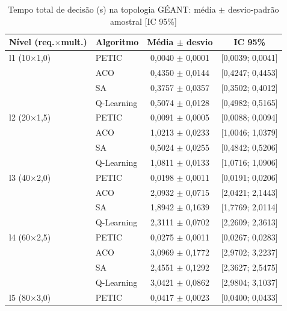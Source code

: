 \begin{table}[htb]
    \centering
    \small
    \caption{Tempo total de decisão (s) na topologia GÉANT: média $\pm$ desvio-padrão amostral [IC 95\%]}
    \label{tab:tempo-geant}
    \begin{tabular}{llcc}
        \hline
        Nível (req.$\times$mult.) & Algoritmo & Média $\pm$ desvio & IC 95\% \\
        \hline
        l1 (10$\times$1,0) & PETIC & 0,0040 $\pm$ 0,0001 & [0,0039; 0,0041] \\
         & ACO & 0,4350 $\pm$ 0,0144 & [0,4247; 0,4453] \\
         & SA & 0,3757 $\pm$ 0,0357 & [0,3502; 0,4012] \\
         & Q-Learning & 0,5074 $\pm$ 0,0128 & [0,4982; 0,5165] \\
        \hline
        l2 (20$\times$1,5) & PETIC & 0,0091 $\pm$ 0,0005 & [0,0088; 0,0094] \\
         & ACO & 1,0213 $\pm$ 0,0233 & [1,0046; 1,0379] \\
         & SA & 0,5024 $\pm$ 0,0255 & [0,4842; 0,5206] \\
         & Q-Learning & 1,0811 $\pm$ 0,0133 & [1,0716; 1,0906] \\
        \hline
        l3 (40$\times$2,0) & PETIC & 0,0198 $\pm$ 0,0011 & [0,0191; 0,0206] \\
         & ACO & 2,0932 $\pm$ 0,0715 & [2,0421; 2,1443] \\
         & SA & 1,8942 $\pm$ 0,1639 & [1,7769; 2,0114] \\
         & Q-Learning & 2,3111 $\pm$ 0,0702 & [2,2609; 2,3613] \\
        \hline
        l4 (60$\times$2,5) & PETIC & 0,0275 $\pm$ 0,0011 & [0,0267; 0,0283] \\
         & ACO & 3,0969 $\pm$ 0,1772 & [2,9702; 3,2237] \\
         & SA & 2,4551 $\pm$ 0,1292 & [2,3627; 2,5475] \\
         & Q-Learning & 3,0421 $\pm$ 0,0862 & [2,9804; 3,1037] \\
        \hline
        l5 (80$\times$3,0) & PETIC & 0,0417 $\pm$ 0,0023 & [0,0400; 0,0433] \\

\end{tabular}
\end{table}
